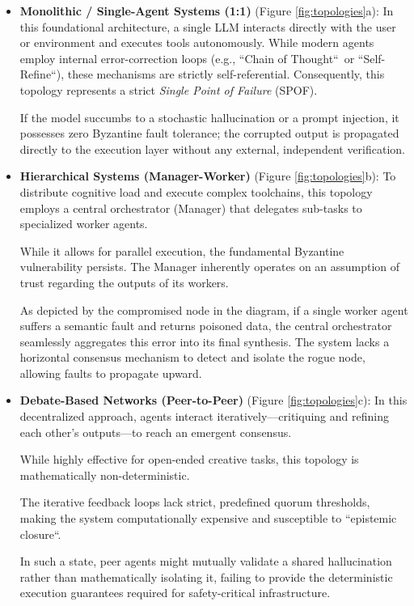 \documentclass[a4paper,11pt,twocolumn]{article}
\theoremstyle{definition}
\theoremstyle{plain}
\begin{document}
\begin{itemize}
    \item \textbf{Monolithic / Single-Agent Systems (1:1)} (Figure \ref{fig:topologies}a): In this foundational architecture, a single LLM interacts directly with the user or environment and executes tools autonomously.
    While modern agents employ internal error-correction loops (e.g., “Chain of Thought“\ or “Self-Refine“), these mechanisms are strictly self-referential. Consequently, this topology represents a strict \textit{Single Point of Failure} (SPOF).
    
    If the model succumbs to a stochastic hallucination or a prompt injection, it possesses zero Byzantine fault tolerance; the corrupted output is propagated directly to the execution layer without any external, independent verification.

    \item \textbf{Hierarchical Systems (Manager-Worker)} (Figure \ref{fig:topologies}b): To distribute cognitive load and execute complex toolchains, this topology employs a central orchestrator (Manager) that delegates sub-tasks to specialized worker agents.

    While it allows for parallel execution, the fundamental Byzantine vulnerability persists.
    The Manager inherently operates on an assumption of trust regarding the outputs of its workers.
    
    As depicted by the compromised node in the diagram, if a single worker agent suffers a semantic fault and returns poisoned data, the central orchestrator seamlessly aggregates this error into its final synthesis.
    The system lacks a horizontal consensus mechanism to detect and isolate the rogue node, allowing faults to propagate upward.

    \item \textbf{Debate-Based Networks (Peer-to-Peer)} (Figure \ref{fig:topologies}c): In this decentralized approach, agents interact iteratively---critiquing and refining each other's outputs---to reach an emergent consensus.
    
    While highly effective for open-ended creative tasks, this topology is mathematically non-deterministic.
    
    The iterative feedback loops lack strict, predefined quorum thresholds, making the system computationally expensive and susceptible to “epistemic closure“.
    
    In such a state, peer agents might mutually validate a shared hallucination rather than mathematically isolating it, failing to provide the deterministic execution guarantees required for safety-critical infrastructure.
    

\end{itemize}
\end{document}
